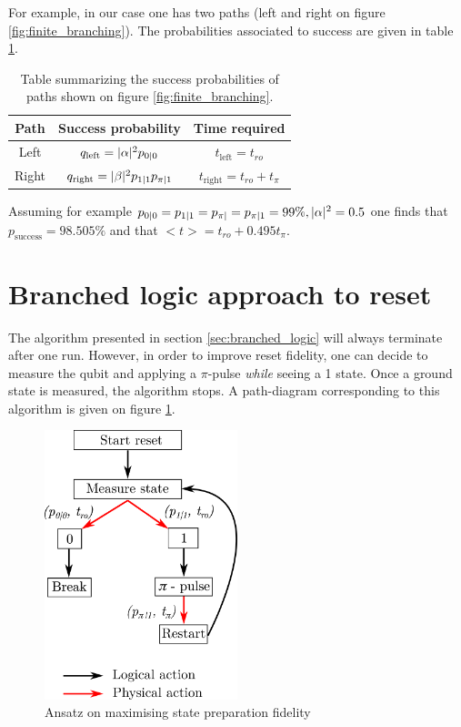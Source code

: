 For example, in our case one has two paths (left and right on figure \ref{fig:finite_branching}). The probabilities associated to success are given in table \ref{tab:path_finite_branching_table}.
 \begin{table}[h]
     \centering
     \begin{tabular}{c|c|c}
        Path & Success probability  & Time required \\ \hline
         Left & $q_\mathrm{left}= \lvert \alpha \rvert^2p_{0|0}$ & $t_\mathrm{left} = t_{ro}$ \\
         Right & $q_\mathrm{right} = \lvert \beta \rvert^2 p_{1|1}p_{\pi|1}$ & $t_\mathrm{right} = t_{ro} + t_\pi$
     \end{tabular}
     \caption{Table summarizing the success probabilities of paths shown on figure \ref{fig:finite_branching}. }
     \label{tab:path_finite_branching_table}
 \end{table}

Assuming for example $p_{0|0} = p_{1|1} = p_{\pi|} = p_{\pi|1} = 99\%, \lvert \alpha \rvert^2  = 0.5$ one finds that $p_\text{success} = 98.505 \%$ and that $<t> =  t_{ro} + 0.495 t_\pi$.



\section{Branched logic approach to reset}
The algorithm presented in section \ref{sec:branched_logic} will always terminate after one run. However, in order to improve reset fidelity, one can decide to measure the qubit and applying a $\pi$-pulse \textit{while} seeing a 1 state. Once a ground state is measured, the algorithm stops. A path-diagram corresponding to this algorithm is given on figure \ref{fig:infinite_branching}.

\begin{figure}[h]
    \centering
    \includegraphics[width=0.5\textwidth]{pic/algorithmic_reset/infinite_branching.png}
    \caption{Ansatz on maximising state preparation fidelity}
    \label{fig:infinite_branching}
\end{figure}

